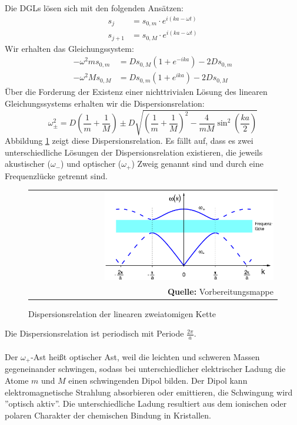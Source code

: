 \documentclass[a4paper,titlepage]{scrartcl}
\numberwithin{equation}{section}
\begin{document}
Die DGLs lösen sich mit den folgenden Ansätzen:
\begin{align*}
s_j&=s_{0,m} \cdot e^{i(ka - \omega t)}\\
s_{j+1}&=s_{0,M} \cdot e^{i(ka - \omega t)}
\end{align*}
Wir erhalten das Gleichungssystem:
\begin{align*}
- \omega^2 m s_{0,m}&=D s_{0,M}(1+e^{-ika})-2D s_{0,m}\\
- \omega^2 M s_{0,M}&=D s_{0,m}(1+e^{ika})-2D s_{0,M}
\end{align*}
Über die Forderung der Existenz einer nichttrivialen Lösung des linearen Gleichungssystems erhalten wir die Dispersionsrelation:
\begin{equation}
\omega^2_{\pm}=D \left(\frac{1}{m} + \frac{1}{M}\right) \pm D \sqrt{\left(\frac{1}{m} + \frac{1}{M}\right)^2-\frac{4}{m M} \sin^2{\left(\frac{ka}{2}\right)}}
\label{eq:dispersionsrelationzweiatom}
\end{equation}
Abbildung \ref{fig:zweiatomkettedispersion} zeigt diese Dispersionsrelation. Es fällt auf, dass es zwei unterschiedliche Lösungen der Dispersionsrelation existieren, die jeweils akustischer ($\omega_{-}$) und optischer ($\omega_{+}$) Zweig genannt sind und durch eine Frequenzlücke getrennt sind.
\begin{figure}[H]
	\centering
	\begin{tabular}{@{}r@{}}
		\includegraphics[width=0.7\textwidth]{images/zweiatomkettedispersion.png}\\
		\footnotesize\sffamily\textbf{Quelle:} Vorbereitungsmappe \cite{vorbereitungsmappe}
	\end{tabular}
	\caption{Dispersionsrelation der linearen zweiatomigen Kette}
    \label{fig:zweiatomkettedispersion}
\end{figure}
Die Dispersionsrelation ist periodisch mit Periode $\frac{2 \pi}{a}$.\\ \\
Der $\omega_{+}$-Ast heißt optischer Ast, weil die leichten und schweren Massen gegeneinander schwingen, sodass bei unterschiedlicher elektrischer Ladung die Atome $m$ und $M$ einen schwingenden Dipol bilden. Der Dipol kann elektromagnetische Strahlung absorbieren oder emittieren, die Schwingung wird ''optisch aktiv''. Die unterschiedliche Ladung resultiert aus dem ionischen oder polaren Charakter der chemischen Bindung in Kristallen.\\ \\
\end{document}
